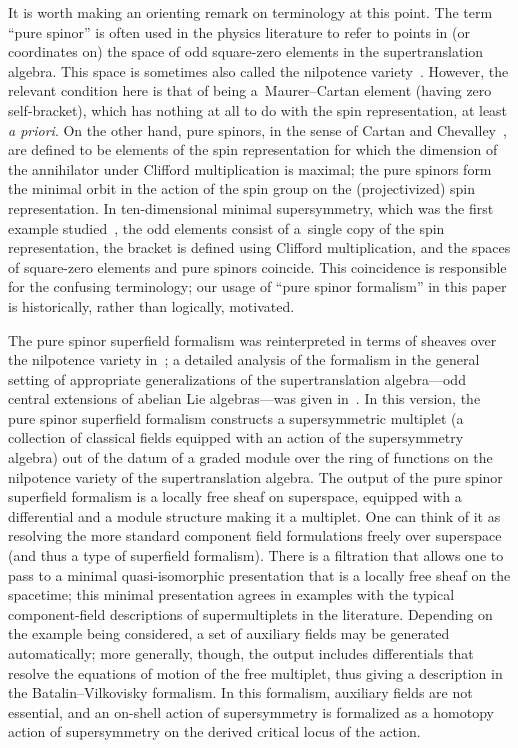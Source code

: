 \documentclass[10pt,a4paper]{amsart}
\numberwithin{equation}{section}
\begin{document}
\begin{rmk}
	It is worth making an orienting remark on terminology at this point. The term ``pure spinor'' is often used in the physics literature to refer to points in (or coordinates on) the space of odd square-zero elements in the supertranslation algebra. This space is sometimes also called the nilpotence variety~\cite{NV}. However, the relevant condition here is that of being a~Maurer--Cartan element (having zero self-bracket), which has nothing at all to do with the spin representation, at least \emph{a priori}.
	On the other hand, pure spinors, in the sense of Cartan and Chevalley~\cite{ChevalleySpinor}, are defined to be elements of the spin representation for which the dimension of the annihilator under Clifford multiplication is maximal; the pure spinors form the minimal orbit in the action of the spin group on the (projectivized) spin representation.
	In ten-dimensional minimal supersymmetry, which was the first example studied~\cite{Nilsson}, the odd elements consist of a~single copy of the spin representation, the bracket is defined using Clifford multiplication, and the spaces of square-zero elements and pure spinors coincide. This coincidence is responsible for the confusing terminology; our usage of ``pure spinor formalism'' in this paper is historically, rather than logically, motivated.
\end{rmk}

The pure spinor superfield formalism was reinterpreted in terms of sheaves over the nilpotence variety in~\cite{NV}; a detailed analysis of the formalism in the general setting of appropriate generalizations of the supertranslation algebra---odd central extensions of abelian Lie algebras---was given in~\cite{perspectives}. In this version, the pure spinor superfield formalism constructs a supersymmetric multiplet (a collection of classical fields equipped with an action of the supersymmetry algebra) out of the datum of a graded module over the ring of functions on the nilpotence variety of the supertranslation algebra.
The output of the pure spinor superfield formalism is a locally free sheaf on superspace, equipped with a differential and a module structure making it a multiplet. One can think of it as resolving the more standard component field formulations freely over superspace (and thus a type of superfield formalism). There is a filtration that allows one to pass to a minimal quasi-isomorphic presentation that is a locally free sheaf on the spacetime; this minimal presentation agrees in examples with the typical component-field descriptions of supermultiplets in the literature.
Depending on the example being considered, a set of auxiliary fields may be generated automatically; more generally, though, the output includes differentials that resolve the equations of motion of the free multiplet, thus giving a description in the Batalin--Vilkovisky formalism. In this formalism, auxiliary fields are not essential, and an on-shell action of supersymmetry is formalized as a homotopy action of supersymmetry on the derived critical locus of the action.
\end{document}
